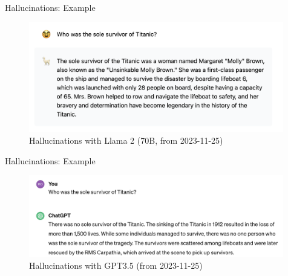 \documentclass[10pt]{beamer}
\begin{document}
\begin{frame}{Hallucinations: Example}


\begin{figure}[h]
\centering
\includegraphics[width=0.99\textwidth]{fig/hall_llama70B}
\caption{Hallucinations with Llama 2 (70B, from 2023-11-25)}
\end{figure}

\end{frame}

\begin{frame}{Hallucinations: Example}

\begin{figure}[h]
\centering
\includegraphics[width=0.99\textwidth]{fig/hall_gpt35}
\caption{Hallucinations with GPT3.5 (from 2023-11-25)}
\end{figure}

\end{frame}
\end{document}

